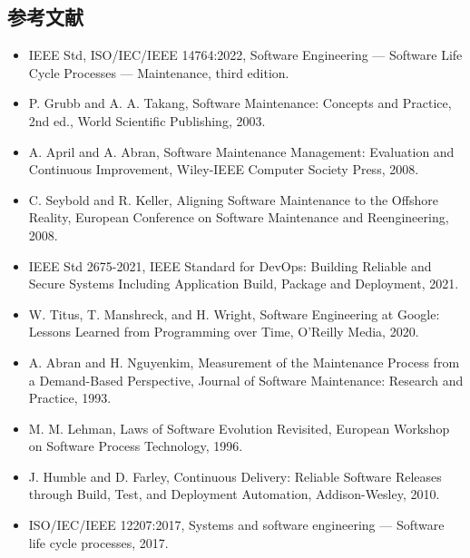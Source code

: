 \documentclass[a4paper,11pt]{ltjsarticle}
\numberwithin{figure}{section}
\numberwithin{table}{section}
\begin{document}
\subsection{参考文献}
\begin{itemize}
\item IEEE Std, ISO/IEC/IEEE 14764:2022, Software Engineering — Software Life Cycle Processes — Maintenance, third edition.
\item P. Grubb and A. A. Takang, Software Maintenance: Concepts and Practice, 2nd ed., World Scientific Publishing, 2003.
\item A. April and A. Abran, Software Maintenance Management: Evaluation and Continuous Improvement, Wiley-IEEE Computer Society Press, 2008.
\item C. Seybold and R. Keller, Aligning Software Maintenance to the Offshore Reality, European Conference on Software Maintenance and Reengineering, 2008.
\item IEEE Std 2675-2021, IEEE Standard for DevOps: Building Reliable and Secure Systems Including Application Build, Package and Deployment, 2021.
\item W. Titus, T. Manshreck, and H. Wright, Software Engineering at Google: Lessons Learned from Programming over Time, O’Reilly Media, 2020.
\item A. Abran and H. Nguyenkim, Measurement of the Maintenance Process from a Demand-Based Perspective, Journal of Software Maintenance: Research and Practice, 1993.
\item M. M. Lehman, Laws of Software Evolution Revisited, European Workshop on Software Process Technology, 1996.
\item J. Humble and D. Farley, Continuous Delivery: Reliable Software Releases through Build, Test, and Deployment Automation, Addison-Wesley, 2010.
\item ISO/IEC/IEEE 12207:2017, Systems and software engineering — Software life cycle processes, 2017.
\end{itemize}
\end{document}
